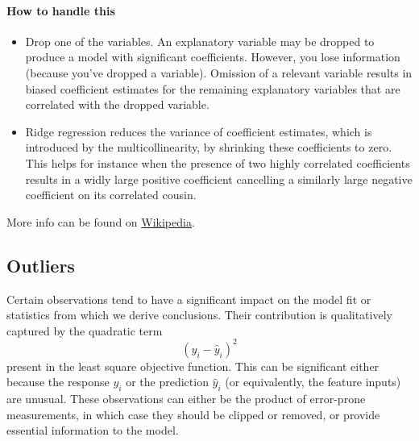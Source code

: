 \documentclass[]{article}
\begin{document}
\paragraph{How to handle this}

\begin{itemize}
\item Drop one of the variables. An explanatory variable may be dropped to produce a model with significant coefficients. However, you lose information (because you've dropped a variable). Omission of a relevant variable results in biased coefficient estimates for the remaining explanatory variables that are correlated with the dropped variable.
\item Ridge regression reduces the variance of coefficient estimates, which is introduced by the multicollinearity, by shrinking these coefficients to zero. This helps for instance when the presence of two highly correlated coefficients results in a widly large positive coefficient cancelling a similarly large negative coefficient on its correlated cousin.
\end{itemize}

\noindent More info can be found on \href{https://en.wikipedia.org/wiki/Multicollinearity}{Wikipedia}.

\subsection{Outliers}

Certain observations tend to have a significant impact on the model fit or statistics from which we derive conclusions. Their contribution is qualitatively captured by the quadratic term
\begin{equation}
(y_i-\hat{y}_i)^2
\end{equation}
present in the least square objective function. This can be significant either because the response $y_i$ or the prediction $\hat{y}_i$ (or equivalently, the feature inputs) are unusual. These observations can either be the product of error-prone measurements, in which case they should be clipped or removed, or provide essential information to the model.
\end{document}
